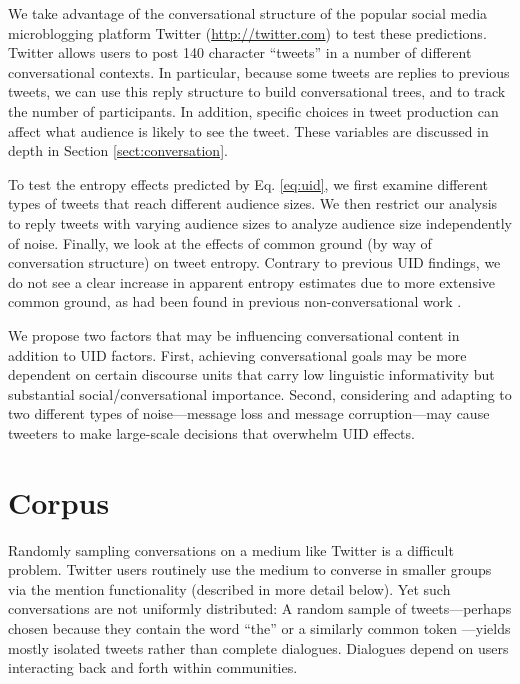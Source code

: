 \documentclass[11pt,letterpaper]{article}
\begin{document}
We take advantage of the conversational structure of the popular social media microblogging platform Twitter (\url{http://twitter.com}) to test these predictions.  Twitter allows users to post 140 character ``tweets'' in a number of different conversational contexts. In particular,  because some tweets are replies to previous tweets, we can use this reply structure to build conversational trees, and to track the number of participants.  In addition, specific choices in tweet production can affect what audience is likely to see the tweet.  These variables are discussed in depth in Section \ref{sect:conversation}.

To test the entropy effects predicted by Eq. \ref{eq:uid}, we first examine different types of tweets that reach different audience sizes.  We then restrict our analysis to reply tweets with varying audience sizes to analyze audience size independently of noise.  Finally, we look at the effects of common ground (by way of conversation structure) on tweet entropy. Contrary to previous UID findings, we do not see a clear increase in apparent entropy estimates due to more extensive common ground, as had been found in previous non-conversational work \cite{genzel2002,qian2012,doyle2015}.  

We propose two factors that may be influencing conversational content in addition to UID factors.  First, achieving conversational goals may be more dependent on certain discourse units that carry low linguistic informativity but substantial social/conversational importance.  Second, considering and adapting to two different types of noise---message loss and message corruption---may cause tweeters to make large-scale decisions that overwhelm UID effects.

\section{Corpus}

Randomly sampling conversations on a medium like Twitter is a difficult problem. Twitter users routinely use the medium to converse in smaller groups via the \@ mention functionality (described in more detail below). Yet such conversations are not uniformly distributed: A random sample of tweets---perhaps chosen because they contain the word ``the'' or a similarly common token \cite{doyle2014}---yields mostly isolated tweets rather than complete dialogues. Dialogues depend on users interacting back and forth within communities.  %
\end{document}
